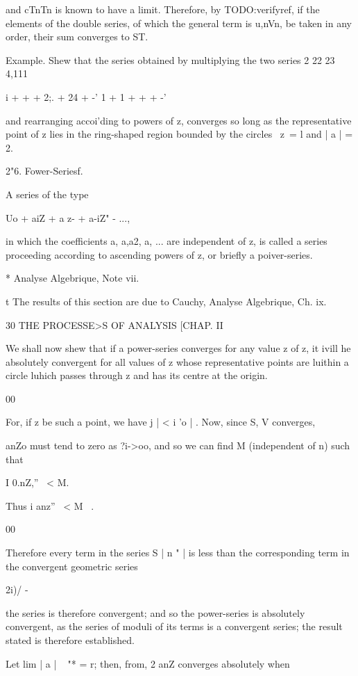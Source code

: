 and cTnTn is known to have a limit. Therefore, by TODO:verifyref, if the
elements of the double series, of which the general term is u,nVn, be
taken in any order, their sum converges to ST.

Example. Shew that the series obtained by multiplying the two series 2
22 23 4,111

i + + + 2;. + 24 + -' 1 + 1 + + + -'

and rearranging accoi'ding to powers of z, converges so long as the
representative point of z lies in the ring-shaped region bounded by
the circles \ z\ = l and | a | = 2.

2"6. Fower-Seriesf.

A series of the type

Uo + aiZ + a z- + a-iZ" - ...,

in which the coefficients a, a,a2, a, ... are independent of z, is
called a series proceeding according to ascending powers of z, or
briefly a poiver-series.

* Analyse Algebrique, Note vii.

t The results of this section are due to Cauchy, Analyse Algebrique,
Ch. ix.

  30 THE PROCESSE>S OF ANALYSIS [CHAP. II

We shall now shew that if a power-series converges for any value z of
z, it ivill he absolutely convergent for all values of z whose
representative points are luithin a circle luhich passes through z and
has its centre at the origin.

00

For, if z be such a point, we have j | < i 'o | . Now, since S, V
converges,

anZo must tend to zero as ?i->oo, and so we can find M (independent
of n) such that

I 0.nZ,'' \ < M.

Thus i anz'' \ < M \ .

00

Therefore every term in the series S | n " | is less than the
corresponding term in the convergent geometric series

2i)/ -

the series is therefore convergent; and so the power-series is
absolutely convergent, as the series of moduli of its terms is a
convergent series; the result stated is therefore established.

Let lim | a | ~ "* = r; then, from, 2 anZ converges absolutely
when

